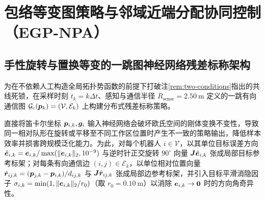 \section{包络等变图策略与邻域近端分配协同控制（EGP-NPA）}\label{sec:method}

\subsection{手性旋转与置换等变的一跳图神经网络残差标称架构}\label{subsec:gnn-arch}
为在不依赖人工构造全局拓扑势函数的前提下打破注\ref{rem:two-conditions}指出的共线死锁，在采样时刻 $t_k=k\Delta t$、感知与通信半径 $R_{\mathrm{sense}}=2.50\ \mathrm m$ 定义的一跳有向通信图 $\mathcal G_{\mathrm c}(\boldsymbol{p}_k)=(\mathcal V,\mathcal E_k)$ 上构建分布式残差标称策略。

直接将笛卡尔坐标 $\boldsymbol{p}_{i,k},\boldsymbol{g}_i$ 输入神经网络会破坏欧氏空间的刚体变换不变性，导致同一相对队形在旋转或平移至不同工作区位置时产生不一致的策略输出，降低样本效率并损害跨规模泛化能力\cite{satorras2021egnn}。为此，对每个机器人 $i\in\mathcal V$，以其单位目标误差方向 $\hat{\boldsymbol{e}}_{i,k}=\boldsymbol{e}_{i,k}/\max(\lVert\boldsymbol{e}_{i,k}\rVert_2,10^{-9})$ 与逆时针正交旋转 $90^\circ$ 向量 $\boldsymbol{J}\hat{\boldsymbol{e}}_{i,k}$ 张成局部目标参考标架；对每条有向通信边 $(i,j)\in\mathcal E_k$，以单位相对位置向量 $\hat{\boldsymbol{r}}_{ij,k}=(\boldsymbol{p}_{j,k}-\boldsymbol{p}_{i,k})/d_{ij,k}$ 与 $\boldsymbol{J}\hat{\boldsymbol{r}}_{ij,k}$ 张成局部边参考标架，并引入目标平滑消隐因子 $\sigma_{i,k}=\min(1,\lVert\boldsymbol{e}_{i,k}\rVert_2/r_0)$（取 $r_0=0.10\ \mathrm m$）以消除 $\boldsymbol{e}_{i,k}\to\boldsymbol 0$ 时的方向角奇异性。

